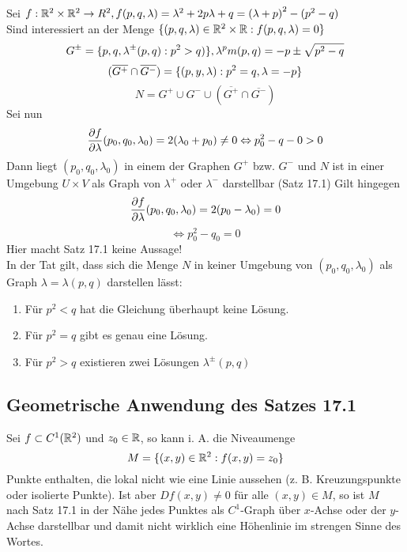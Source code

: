 \documentclass[../ana2u.tex]{subfiles}
\begin{document}
\begin{bsp}
    Sei \(f:\mathbb{R}^2 \times \mathbb{R}^2\rightarrow R^2, 
    f(p,q,\lambda) = \lambda^2 + 2p\lambda + q = {(\lambda + p)}^2-(p^2 - q)\)\\
    Sind interessiert an der Menge 
    \(\{(p,q, \lambda) \in \mathbb{R}^2 \times \mathbb{R}: f(p,q,\lambda) = 0\}\)
    \[ G^{\pm} = \{p,q, \lambda^\pm(p,q): p^2 > q)\}, 
    \lambda^pm (p,q) = -p \pm \sqrt{p^2-q}\]
    \[ (\overline{G^+} \cap \overline{G^-}) = \{(p,y,\lambda): p^2 = q, \lambda = -p\} \]
    \[ N = G^+ \cup G^- \cup (\overline{G^+} \cap \overline{G^-}) \]    
    Sei nun 
    \[ \frac{\partial f}{\partial\lambda} (p_0, q_0, \lambda_0) 
    = 2(\lambda_0 + p_0) \neq 0 \Leftrightarrow p_0^2 - q-0 > 0\]
    Dann liegt \((p_0, q_0, \lambda_0)\) in einem der Graphen \(G^+\) bzw. \(G^-\)
    und \(N\) ist in einer Umgebung \(U \times V\) als Graph von 
    \(\lambda^+\) oder \(\lambda^-\) darstellbar (Satz 17.1)
    Gilt hingegen 
    \[\frac{\partial f}{\partial\lambda}(p_0,q_0,\lambda_0) = 2(p_0-\lambda_0) = 0\]
    \[ \Leftrightarrow p_0^2 - q_0 = 0 \]
    Hier macht Satz 17.1 keine Aussage! \\
    In der Tat gilt, dass sich die Menge 
    \(N\) in keiner Umgebung von \((p_0, q_0, \lambda_0)\) als Graph 
    \(\lambda = \lambda(p,q)\) darstellen lässt:
    \begin{enumerate}
        \item Für \(p^2 < q\) hat die Gleichung überhaupt keine Lösung. 
        \item Für \(p^2 = q\) gibt es genau eine Lösung.
        \item Für \(p^2 > q\) existieren zwei Lösungen \(\lambda^\pm(p,q)\)
    \end{enumerate}    
\end{bsp}
\subsection{Geometrische Anwendung des Satzes 17.1}
Sei \(f \subset C^1(\mathbb{R}^2)\) und \(z_0 \in \mathbb{R}\), so kann i. A. die
Niveaumenge
\[ M = \{(x,y) \in \mathbb{R}^2: f(x,y) = z_0\} \]
Punkte enthalten, die lokal nicht wie eine Linie aussehen 
(z. B. Kreuzungspunkte oder isolierte Punkte).
Ist aber \(Df(x,y) \neq 0\) für alle \((x,y) \in M\), so ist
\(M\) nach Satz 17.1 in der Nähe jedes Punktes als
\(C^1\)-Graph über \(x\)-Achse oder der \(y\)-Achse darstellbar
und damit nicht wirklich eine Höhenlinie im strengen Sinne des Wortes.
\end{document}
